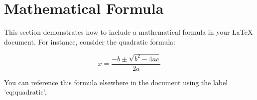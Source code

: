 \section{Mathematical Formula}
\label{sec:math-formula}

This section demonstrates how to include a mathematical formula in your LaTeX document. For instance, consider the quadratic formula:

\begin{equation}
\label{eq:quadratic}
x = \frac{-b \pm \sqrt{b^2 - 4ac}}{2a}
\end{equation}

You can reference this formula elsewhere in the document using the label 'eq:quadratic'.
